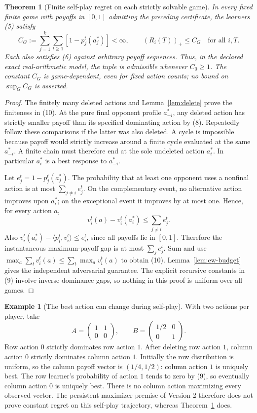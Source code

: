 \documentclass[11pt]{article}
\newtheorem{theorem}{Theorem}
\theoremstyle{definition}
\newtheorem{example}{Example}
\theoremstyle{remark}
\begin{document}
\begin{theorem}[Finite self-play regret on each strictly solvable game]
\label{thm:strict}
In every fixed finite game with payoffs in $[0,1]$ admitting the preceding
certificate, the learners (5) satisfy
\[
 C_G:=\sum_{j=1}^k\sum_{t\geq1}[1-p_j^t(a_j^*)]<\infty,
 \qquad (R_i(T))_+\leq C_G\quad\text{for all }i,T.     \tag{10}
\]
Each also satisfies (6) against arbitrary payoff sequences. Thus, in the
declared exact real-arithmetic model, the tuple is admissible whenever
$C_0\geq1$. The constant $C_G$ is game-dependent, even for fixed action
counts; no bound on $\sup_G C_G$ is asserted.
\end{theorem}
\begin{proof}
The finitely many deleted actions and Lemma~\ref{lem:delete} prove the
finiteness in (10). At the pure final opponent profile $a_{-i}^*$, any
deleted action has strictly smaller payoff than its specified dominating
action by (8). Repeatedly follow these comparisons if the latter was also
deleted. A cycle is impossible because payoff would strictly increase
around a finite cycle evaluated at the same $a_{-i}^*$. A finite chain must
therefore end at the sole undeleted action $a_i^*$. In particular
$a_i^*$ is a best response to $a_{-i}^*$.

Let $e_j^t=1-p_j^t(a_j^*)$. The probability that at least one opponent
uses a nonfinal action is at most $\sum_{j\ne i}e_j^t$. On the
complementary event, no alternative action improves upon $a_i^*$; on the
exceptional event it improves by at most one. Hence, for every action $a$,
\[
 v_i^t(a)-v_i^t(a_i^*)\leq\sum_{j\ne i}e_j^t.
\]
Also $v_i^t(a_i^*)-\langle p_i^t,v_i^t\rangle\leq e_i^t$, since all
payoffs lie in $[0,1]$. Therefore the instantaneous maximum-payoff gap is
at most $\sum_j e_j^t$. Sum and use
$\max_a\sum_t v_i^t(a)\leq\sum_t\max_a v_i^t(a)$ to obtain (10).
Lemma~\ref{lem:ew-budget} gives the independent adversarial guarantee.
The explicit recursive constants in (9) involve inverse dominance gaps,
so nothing in this proof is uniform over all games.
\end{proof}

\begin{example}[The best action can change during self-play]
With two actions per player, take
\[
 A=\begin{pmatrix}1&1\\0&0\end{pmatrix},\qquad
 B=\begin{pmatrix}1/2&0\\0&1\end{pmatrix}.
\]
Row action $0$ strictly dominates row action $1$. After deleting row action
$1$, column action $0$ strictly dominates column action $1$. Initially the
row distribution is uniform, so the column payoff vector is $(1/4,1/2)$:
column action $1$ is uniquely best. The row learner's probability of action
$1$ tends to zero by (9), so eventually column action $0$ is uniquely best.
There is no column action maximizing every observed vector. The persistent
maximizer premise of Version 2 therefore does not prove constant regret on
this self-play trajectory, whereas Theorem~\ref{thm:strict} does.
\end{example}
\end{document}
